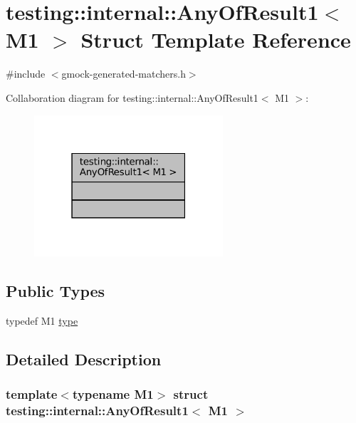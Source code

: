 \hypertarget{structtesting_1_1internal_1_1AnyOfResult1}{}\section{testing\+:\+:internal\+:\+:Any\+Of\+Result1$<$ M1 $>$ Struct Template Reference}
\label{structtesting_1_1internal_1_1AnyOfResult1}


{\ttfamily \#include $<$gmock-\/generated-\/matchers.\+h$>$}



Collaboration diagram for testing\+:\+:internal\+:\+:Any\+Of\+Result1$<$ M1 $>$\+:
\nopagebreak
\begin{figure}[H]
\begin{center}
\leavevmode
\includegraphics[width=199pt]{structtesting_1_1internal_1_1AnyOfResult1__coll__graph}
\end{center}
\end{figure}
\subsection*{Public Types}
\begin{DoxyCompactItemize}
\item 
typedef M1 \hyperlink{structtesting_1_1internal_1_1AnyOfResult1_a4c55b5cf196c93e2a822bc99625f6797}{type}
\end{DoxyCompactItemize}


\subsection{Detailed Description}
\subsubsection*{template$<$typename M1$>$\newline
struct testing\+::internal\+::\+Any\+Of\+Result1$<$ M1 $>$}



